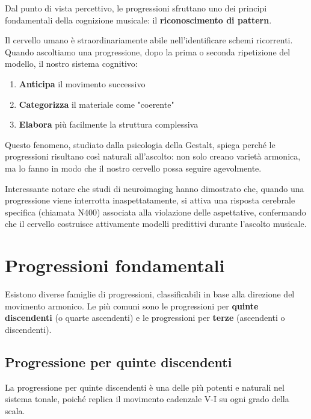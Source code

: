 \begin{fisica}
	Dal punto di vista percettivo, le progressioni sfruttano uno dei principi fondamentali della cognizione musicale: il \textbf{riconoscimento di pattern}. 
	
	Il cervello umano è straordinariamente abile nell'identificare schemi ricorrenti. Quando ascoltiamo una progressione, dopo la prima o seconda ripetizione del modello, il nostro sistema cognitivo:
	\begin{enumerate}
		\item \textbf{Anticipa} il movimento successivo
		\item \textbf{Categorizza} il materiale come "coerente"
		\item \textbf{Elabora} più facilmente la struttura complessiva
	\end{enumerate}
	
	Questo fenomeno, studiato dalla psicologia della Gestalt, spiega perché le progressioni risultano così naturali all'ascolto: non solo creano varietà armonica, ma lo fanno in modo che il nostro cervello possa seguire agevolmente.
	
	Interessante notare che studi di neuroimaging hanno dimostrato che, quando una progressione viene interrotta inaspettatamente, si attiva una risposta cerebrale specifica (chiamata N400) associata alla violazione delle aspettative, confermando che il cervello costruisce attivamente modelli predittivi durante l'ascolto musicale.
\end{fisica}

\section{Progressioni fondamentali}
\label{sec:progressioni_fondamentali}

Esistono diverse famiglie di progressioni, classificabili in base alla direzione del movimento armonico. Le più comuni sono le progressioni per \textbf{quinte discendenti} (o quarte ascendenti) e le progressioni per \textbf{terze} (ascendenti o discendenti).

\subsection{Progressione per quinte discendenti}
\label{subsec:progressione_quinte}

La progressione per quinte discendenti è una delle più potenti e naturali nel sistema tonale, poiché replica il movimento cadenzale V-I su ogni grado della scala.

